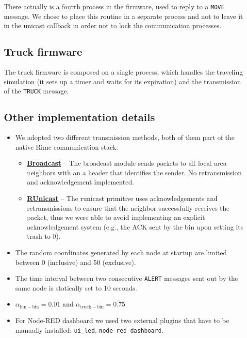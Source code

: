 \documentclass[a4paper, 11pt, parskip=half]{scrartcl}
\begin{document}
There actually is a fourth process in the firmware, used to reply to a \texttt{MOVE} message. We chose to place this routine in a separate process and not to leave it in the unicast callback in order not to lock the communication processes.

\subsection{Truck firmware}

The truck firmware is composed on a single process, which handles the traveling simulation (it sets up a timer and waits for its expiration) and the transmission of the \texttt{TRUCK} message.

\subsection{Other implementation details}

\begin{itemize}
	\item We adopted two different transmission methods, both of them part of the native Rime communication stack:
		\begin{itemize}
			\item \href{http://contiki.sourceforge.net/docs/2.6/a01720.html}{\textbf{Broadcast}} -- The broadcast module sends packets to all local area neighbors with an a header that identifies the sender. No retransmission and acknowledgement implemented.
			\item \href{http://contiki.sourceforge.net/docs/2.6/a01738.html}{\textbf{RUnicast}} -- The runicast primitive uses acknowledgements and retransmissions to ensure that the neighbor successfully receives the packet, thus we were able to avoid implementing an explicit acknowledgement system (e.g., the ACK sent by the bin upon setting its trash to 0).
		\end{itemize}
	\item The random coordinates generated by each node at startup are limited between 0 (inclusive) and 50 (exclusive).
	\item The time interval between two consecutive \texttt{ALERT} messages sent out by the same node is statically set to 10 seconds.
	\item $\alpha_\mathrm{bin-bin} = 0.01$ and $\alpha_\mathrm{truck-bin} = 0.75$
	\item For Node-RED dashboard we used two external plugins that have to be manually installed: \texttt{ui\_led}, \texttt{node-red-dashboard}.
\end{itemize}
\end{document}
